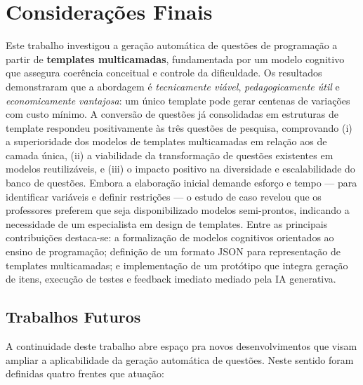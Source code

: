 
\chapter{Considerações Finais}

Este trabalho investigou a geração automática de questões de programação a partir de \textbf{templates multicamadas}, fundamentada por um modelo cognitivo que assegura coerência conceitual e controle da dificuldade. Os resultados demonstraram que a abordagem é \textit{tecnicamente viável}, \textit{pedagogicamente útil} e \textit{economicamente vantajosa}: um único template pode gerar centenas de variações com custo mínimo. A conversão de questões já consolidadas em estruturas de template respondeu positivamente às três questões de pesquisa, comprovando (i) a superioridade dos modelos de templates multicamadas em relação aos de camada única, (ii) a viabilidade da transformação de questões existentes em modelos reutilizáveis, e (iii) o impacto positivo na diversidade e escalabilidade do banco de questões. Embora a elaboração inicial demande esforço e tempo — para identificar variáveis e definir restrições — o estudo de caso revelou que os professores preferem que seja disponibilizado modelos semi-prontos, indicando a necessidade de um especialista em design de templates. Entre as principais contribuições destaca-se: a formalização de modelos cognitivos orientados ao ensino de programação; definição de um formato JSON para representação de templates multicamadas; e implementação de um protótipo que integra geração de itens, execução de testes e feedback imediato mediado pela IA generativa. 

\section*{Trabalhos Futuros}

A continuidade deste trabalho abre espaço pra novos desenvolvimentos que visam ampliar a aplicabilidade da geração automática de questões. Neste sentido foram definidas quatro frentes que atuação:

